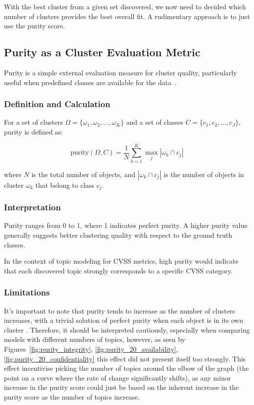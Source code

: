 \documentclass[12pt]{article}
\begin{document}
With the best cluster from a given set discovered, we now need to decided which number of clusters
provides the best overall fit. A rudimentary approach is to just use the purity score.

\subsection{Purity as a Cluster Evaluation Metric}\label{sec:purity}

Purity is a simple external evaluation measure for cluster quality, particularly useful when
predefined classes are available for the data~\cite{purity_usuage}.

\subsubsection*{Definition and Calculation}

For a set of clusters $\Omega = \{\omega_1, \omega_2, ..., \omega_K\}$ and a set of classes $C =
	\{c_1, c_2, ..., c_J\}$, purity is defined as:

\begin{equation}
	\text{purity}(\Omega, C) = \frac{1}{N} \sum_{k=1}^K \max_j |\omega_k \cap c_j|
\end{equation}

where $N$ is the total number of objects, and $|\omega_k \cap c_j|$ is the number of objects in
cluster $\omega_k$ that belong to class $c_j$.

\subsubsection*{Interpretation}

Purity ranges from 0 to 1, where 1 indicates perfect purity. A higher purity value generally
suggests better clustering quality with respect to the ground truth classes\cite{purity_info_ret}.

In the context of topic modeling for CVSS metrics, high purity would indicate that each discovered
topic strongly corresponds to a specific CVSS category.

\subsubsection*{Limitations}

It's important to note that purity tends to increase as the number of clusters increases, with a
trivial solution of perfect purity when each object is in its own cluster \cite{v-measure}.
Therefore, it should be interpreted cautiously, especially when comparing models with different
numbers of topics, however, as seen by Figures~\ref{fig:purity_integrity},
\ref{fig:purity_20_availability}, \ref{fig:purity_20_confidentiality} this effect did not present
itself too strongly. This effect incentivise picking the number of topics around the elbow of the
graph (the point on a curve where the rate of change significantly shifts), as any minor increase in
the purity score could just be based on the inherent increase in the purity score as the number of
topics increase.
\end{document}
